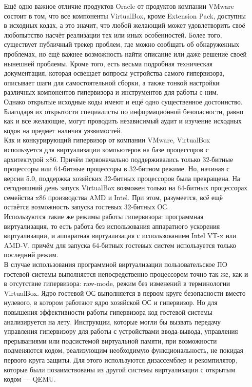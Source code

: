 \documentclass[14pt, a4paper]{article}
\begin{document}
Ещё одно важное отличие продуктов Oracle от продуктов компании VMware состоит в том, что все
компоненты VirtualBox, кроме Extension Pack, доступны в исходных кодах, а это значит, что любой
желающий может удовлетворить своё любопытство насчёт реализации тех или иных особенностей.
Более того, существует публичный трекер проблем, где можно сообщать об обнаруженных
проблемах, но ещё важнее возможность найти описание или даже решение своей нынешней
проблемы. Кроме того, есть весьма подробная техническая документация, которая освещает вопросы
устройства самого гипервизора, описывает шаги для самостоятельной сборки, а также тонкой
настройки различных компонентов гипервизора и инструментов для работы с ним.\\

Однако открытые исходные коды имеют и ещё одно существенное достоинство. Благодаря их
открытости специалисты по информационной безопасности, равно как и все желающие, могут
проводить независимый аудит и изучение исходных кодов на предмет наличия уязвимостей.\\

Как и конкурирующий гипервизор от компании VMware, VirtualBox используется для виртуализации
компьютеров на базе процессоров с архитектурой x86. Причём первоначально поддерживались
только 32-битные процессоры или 64-битные процессоры в 32-битном режиме. Но, начиная с версии
5.0, поддержка хозяйских 32-битных процессоров была прекращена. На сегодняшний день запуск
VirtualBox возможен только на 64-битных процессорах семейства x86 производства AMD и Intel. При
этом, разумеется, всё ещё остаётся возможность запуска гостевых 32-битных ОС.\\

Используются такие же режимы работы гипервизора: программная виртуализация, то есть работа без
использования аппаратного ускорения виртуализации, и аппаратная виртуализация с использованием
Intel VT-x или AMD-V, причём для запуска 64-битных гостевых систем используется только последний
режим.\\

В случае использования программной виртуализации пользовательское ПО гостевой системы
выполняется непосредственно процессором точно так же, как и в отсутствие гипервизора: raw-mode,
режим без изменений в терминологии VirtualBox. Ядро гостевой ОС выполняется в первом круге
безопасности вместо нулевого, в котором работают ядро хозяйской ОС и гипервизор. Но для
повышения эффективности работы гипервизора код гостевой системы анализируется на лету.
Инструкции, которые могли бы вызвать передачу управления гипервизору для работы с устройствами
ввода-вывода, управления прерываниями или подсистемой виртуальной памяти, при возможности
подменяются кодом, реализующим необходимую функциональность, не покидая первого круга
защиты. Для этого используются дизассемблер и рекомпилятор, которые были позаимствованы из
другой системы виртуализации с открытым кодом — QEMU.\\
\end{document}
